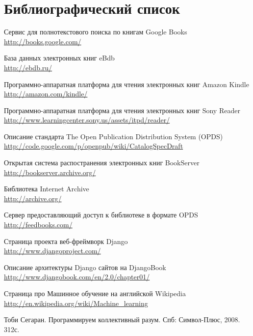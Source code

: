 \cleardoublepage
\section{Библиографический список}
 
\renewcommand*{\refname}{}
\begin{thebibliography}{99}

 Сервис для полнотекстового поиска по книгам Google Books \\ \url{http://books.google.com/}

 База данных электронных книг eBdb\\  \url{http://ebdb.ru/}

 Программно-аппаратная платформа для чтения электронных книг Amazon Kindle\\ \url{http://amazon.com/kindle/}

 Программно-аппаратная платформа для чтения электронных книг Sony Reader\\ \url{http://www.learningcenter.sony.us/assets/itpd/reader/}

 Описание стандарта The Open Publication Distribution System (OPDS)\\ \url{http://code.google.com/p/openpub/wiki/CatalogSpecDraft}

 Открытая система распостранения электронных книг BookServer\\ \url{http://bookserver.archive.org/}

 Библиотека Internet Archive\\ \url{http://archive.org/}

 Сервер предоставляющий доступ к библиотеке в формате OPDS \\ \url{http://feedbooks.com/}

 Страница проекта веб-фреймворк Django\\ \url{http://www.djangoproject.com/}

 Описание архитектуры Django сайтов на DjangoBook\\ \url{http://www.djangobook.com/en/2.0/chapter01/}

 Страница про Машинное обучение на английской Wikipedia\\ \url{http://en.wikipedia.org/wiki/Machine_learning}

 Тоби Сегаран. Программируем коллективный разум. Спб: Символ-Плюс, 2008. 312с.


\end{thebibliography}
